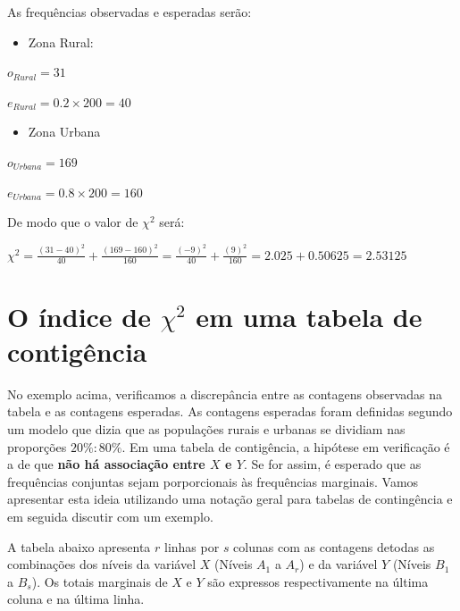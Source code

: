 \documentclass[
]{book}
\providecommand{\tightlist}{%
  \setlength{\itemsep}{0pt}\setlength{\parskip}{0pt}}
\begin{document}
As frequências observadas e esperadas serão:

\begin{itemize}
\tightlist
\item
  Zona Rural:
\end{itemize}

\(o_{Rural} = 31\)

\(e_{Rural} = 0.2 \times 200 = 40\)

\begin{itemize}
\tightlist
\item
  Zona Urbana
\end{itemize}

\(o_{Urbana} = 169\)

\(e_{Urbana} = 0.8 \times 200 = 160\)

De modo que o valor de \(\chi^2\) será:

\(\chi^2 = \frac{(31 - 40)^2}{40} + \frac{(169 - 160)^2}{160} = \frac{(-9)^2}{40} + \frac{(9)^2}{160} = 2.025 + 0.50625 = 2.53125\)

\hypertarget{o-uxedndice-de-chi2-em-uma-tabela-de-contiguxeancia}{%
\section{\texorpdfstring{O índice de \(\chi^2\) em uma tabela de contigência}{O índice de \textbackslash chi\^{}2 em uma tabela de contigência}}\label{o-uxedndice-de-chi2-em-uma-tabela-de-contiguxeancia}}

No exemplo acima, verificamos a discrepância entre as contagens observadas na tabela e as contagens esperadas. As contagens esperadas foram definidas segundo um modelo que dizia que as populações rurais e urbanas se dividiam nas proporções \(20\%:80\%\). Em uma tabela de contigência, a hipótese em verificação é a de que \textbf{não há associação entre \(X\) e \(Y\)}. Se for assim, é esperado que as frequências conjuntas sejam porporcionais às frequências marginais. Vamos apresentar esta ideia utilizando uma notação geral para tabelas de contingência e em seguida discutir com um exemplo.

A tabela abaixo apresenta \(r\) linhas por \(s\) colunas com as contagens detodas as combinações dos níveis da variável \(X\) (Níveis \(A_{1}\) a \(A_{r}\)) e da variável \(Y\) (Níveis \(B_{1}\) a \(B_{s}\)). Os totais marginais de \(X\) e \(Y\) são expressos respectivamente na última coluna e na última linha.
\end{document}
